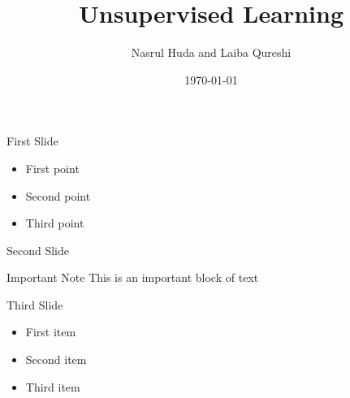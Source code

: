 \documentclass{beamer}
\title{Unsupervised Learning}
\author{Nasrul Huda and Laiba Qureshi}
\date{\today}
\begin{document}
\begin{frame}
    \titlepage
\end{frame}

\begin{frame}{First Slide}
    \begin{itemize}
        \item First point
        \item Second point
        \item Third point
    \end{itemize}
\end{frame}

\begin{frame}{Second Slide}
    \begin{block}{Important Note}
        This is an important block of text
    \end{block}
\end{frame}

\begin{frame}{Third Slide}
    \begin{itemize}
        \item First item
        \item Second item
        \item Third item
    \end{itemize}
\end{frame}
\end{document}
